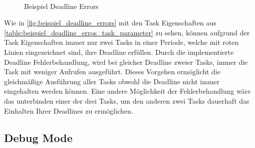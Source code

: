 \documentclass[../EDF Master Thesis.tex]{subfiles}
\begin{document}
\begin{figure}[ht!]
\\
        \caption{Beispiel Deadline Errors}
        \label{fig:beispiel_deadline_errors}
    \end{figure}

    Wie in \autoref{fig:beispiel_deadline_errors} mit den Task Eigenschaften aus \autoref{table:beispiel_deadline_erros_task_parameter} zu sehen, können aufgrund der Task Eigenschaften immer nur zwei Tasks in einer Periode, welche mit roten Linien eingezeichnet sind, ihre Deadline erfüllen.
    Durch die implementierte Deadline Fehlerbehandlung, wird bei gleicher Deadline zweier Tasks, immer die Task mit weniger Aufrufen ausgeführt.
    Dieses Vorgehen ermöglicht die gleichmäßige Ausführung aller Tasks obwohl die Deadline nicht immer eingehalten werden können.
    Eine andere Möglichkeit der Fehlerbehandlung wäre das unterbinden einer der drei Tasks, um den anderen zwei Tasks dauerhaft das Einhalten Ihrer Deadlines zu ermöglichen.

\subsection{Debug Mode} \label{section:debug_mode}

    
    
\end{document}
